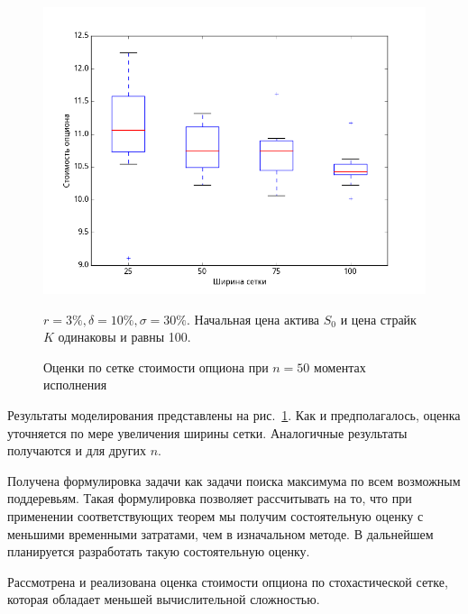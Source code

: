 \documentclass[specialist,
               substylefile = ../spbu.rtx,
               subf,href,colorlinks=true, 12pt]{disser}
\begin{document}
\begin{figure}[t!]
    \includegraphics[width=\textwidth]{plot_100}
    \caption{Оценки по сетке стоимости опциона при $n = 50$ моментах исполнения}
    \label{fig:boxplot}
    $r = 3\%, \delta = 10\%, \sigma = 30\%$. Начальная цена актива $S_0$ и цена страйк $K$ одинаковы и равны 100.
\end{figure}

Результаты моделирования представлены на рис.~\ref{fig:boxplot}. Как и предполагалось, оценка уточняется по мере увеличения ширины сетки. Аналогичные результаты получаются и для других $n$.

\conclusion
Получена формулировка задачи как задачи поиска максимума по всем возможным поддеревьям. Такая формулировка позволяет рассчитывать на то, что при применении соответствующих теорем  мы получим состоятельную оценку с меньшими временными затратами, чем в изначальном методе.
В дальнейшем планируется разработать такую состоятельную оценку.

Рассмотрена и реализована оценка стоимости опциона по стохастической сетке, которая  обладает меньшей вычислительной сложностью.


\end{document}
